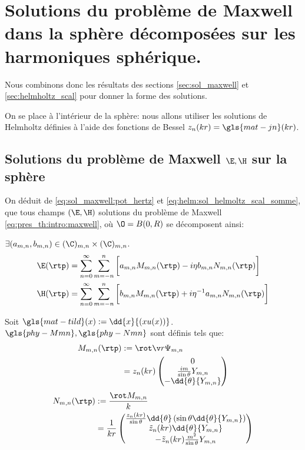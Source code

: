 \section{Solutions du problème de Maxwell dans la sphère décomposées sur les harmoniques sphérique.}\label{sec:maxwell_harmonique}

Nous combinons donc les résultats des sections \ref{sec:sol_maxwell} et \ref{sec:helmholtz_scal} pour donner la forme des solutions.

On se place à l'intérieur de la sphère: nous allons utiliser les solutions de Helmholtz définies à l'aide des fonctions de Bessel $z_n(kr) = \gls{mat-jn}(kr)$.

\subsection{Solutions du problème de Maxwell $\E,\H$ sur la sphère}
On déduit de  \eqref{eq:sol_maxwell:pot_hertz} et \eqref{eq:helm:sol_helmoltz_scal_somme}, que tous champs $(\E,\H)$ solutions du problème de Maxwell \eqref{eq:pres_th:intro:maxwell}, où $\O = B(0,R)$ se décomposent ainsi:

$\exists (a_{m,n},b_{m,n}) \in (\C)_{m,n}\times (\C)_{m,n}$.
\begin{align*}
  \E(\rtp) &= \sum\limits_{n=0}^\infty\sum\limits_{m=-n}^n\bigg[ a_{m,n}   M_{m,n}(\rtp) - i \eta b_{m,n} N_{m,n}(\rtp)\bigg]\\
  \H(\rtp) &= \sum\limits_{n=0}^\infty\sum\limits_{m=-n}^n\bigg[ b_{m,n}   M_{m,n}(\rtp) + i {\eta}^{-1} a_{m,n} N_{m,n}(\rtp)\bigg]
\end{align*}

Soit $\gls{mat-tild}(x) := \dd{x}{\left(xu(x)\right)}$. $\gls{phy-Mmn} ,\gls{phy-Nmn}$ sont définis tels que:
\begin{align}
 \label{eq:defMmn}
  M_{m,n}(\rtp) &:= \rot \v r \Psi_{m,n} \\
  &= z_n(kr)
  \begin{pmatrix}
    0 \\ \frac{im}{\sin\theta}Y_{m,n}\\ 
    - \dd{\theta}{Y_{m,n}}
  \end{pmatrix}
\end{align}
\begin{align}
\label{eq:defNmn}
  N_{m,n}(\rtp) &:= \frac{\rot M_{m,n}}{k} \\
  &= \frac{1}{kr}\begin{pmatrix}
    \frac{z_n(kr)}{\sin\theta}\dd{\theta}\left(\sin\theta\dd{\theta}{Y_{m,n}}\right)\\ 
    \tilde z_n(kr)\dd{\theta}{Y_{m,n}}\\ 
    -\tilde z_n(kr)\frac{m^2}{\sin\theta}Y_{m,n}\\
  \end{pmatrix} 
\end{align}


